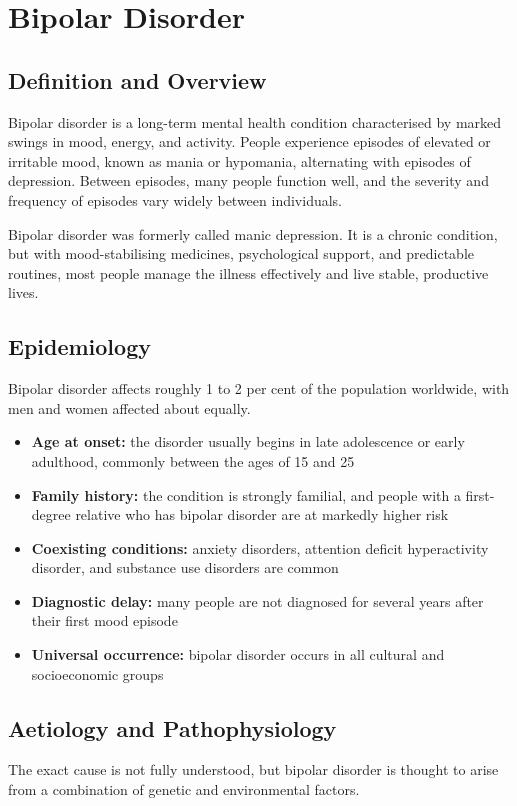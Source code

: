 \chapter{Bipolar Disorder}

\section*{Definition and Overview}
Bipolar disorder is a long-term mental health condition characterised by marked swings in mood, energy, and activity. People experience episodes of elevated or irritable mood, known as mania or hypomania, alternating with episodes of depression. Between episodes, many people function well, and the severity and frequency of episodes vary widely between individuals.

Bipolar disorder was formerly called manic depression. It is a chronic condition, but with mood-stabilising medicines, psychological support, and predictable routines, most people manage the illness effectively and live stable, productive lives.

\section*{Epidemiology}
Bipolar disorder affects roughly 1 to 2 per cent of the population worldwide, with men and women affected about equally.

\begin{itemize}
    \item \textbf{Age at onset:} the disorder usually begins in late adolescence or early adulthood, commonly between the ages of 15 and 25
    \item \textbf{Family history:} the condition is strongly familial, and people with a first-degree relative who has bipolar disorder are at markedly higher risk
    \item \textbf{Coexisting conditions:} anxiety disorders, attention deficit hyperactivity disorder, and substance use disorders are common
    \item \textbf{Diagnostic delay:} many people are not diagnosed for several years after their first mood episode
    \item \textbf{Universal occurrence:} bipolar disorder occurs in all cultural and socioeconomic groups
\end{itemize}

\section*{Aetiology and Pathophysiology}
The exact cause is not fully understood, but bipolar disorder is thought to arise from a combination of genetic and environmental factors.


